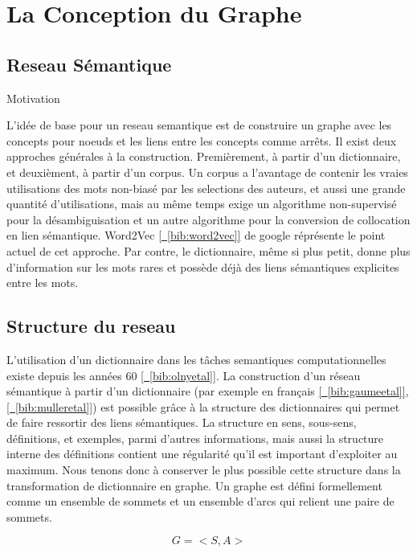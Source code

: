 \section{La Conception du Graphe}

\subsection{Reseau Sémantique}

Motivation

L'idée de base pour un reseau semantique est de construire un graphe avec
les concepts pour noeuds et les liens entre les concepts comme arrêts.
Il exist deux approches générales à la construction. Premièrement, à
partir d'un dictionnaire, et deuxièment, à partir d'un corpus.
Un corpus a l'avantage de contenir les vraies utilisations des mots non-biasé
par les selections des auteurs, et aussi une grande
quantité d'utilisations, mais au même temps exige un algorithme non-supervisé pour la
désambiguisation et un autre algorithme pour la conversion de collocation en lien sémantique.
Word2Vec \hyperref[bib:word2vec]{[~\ref*{bib:word2vec}]} de
google réprésente le point actuel de cet approche.
Par contre, le dictionnaire, même si plus petit, donne plus
d'information sur les mots rares et possède déjà des liens sémantiques explicites entre
les mots.

\subsection{Structure du reseau}

L'utilisation d'un dictionnaire dans les tâches semantiques computationnelles
existe depuis les années 60 \hyperref[bib:olnyetal]{[~\ref*{bib:olnyetal}]}.
La construction d'un réseau sémantique à partir d'un dictionnaire (par exemple
en français \hyperref[bib:gaumeetal]{[~\ref*{bib:gaumeetal}]},
\hyperref[bib:mulleretal]{[~\ref*{bib:mulleretal}]}) est possible 
grâce à la structure des dictionnaires qui permet de faire ressortir des liens 
sémantiques. La structure en sens, sous-sens, définitions, et exemples, parmi 
d'autres informations, mais aussi la structure interne des définitions contient 
une régularité qu'il est important d'exploiter au maximum. Nous tenons donc à 
conserver le plus possible cette structure dans la transformation de dictionnaire 
en graphe. Un graphe est défini formellement comme un ensemble de sommets et un 
ensemble d'arcs qui relient une paire de sommets.

\[
G = <S, A>
\]

